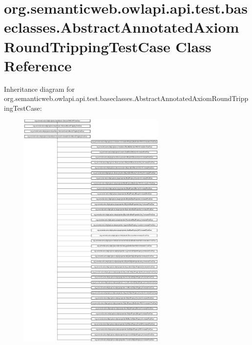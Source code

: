 \hypertarget{classorg_1_1semanticweb_1_1owlapi_1_1api_1_1test_1_1baseclasses_1_1_abstract_annotated_axiom_round_tripping_test_case}{\section{org.\-semanticweb.\-owlapi.\-api.\-test.\-baseclasses.\-Abstract\-Annotated\-Axiom\-Round\-Tripping\-Test\-Case Class Reference}
\label{classorg_1_1semanticweb_1_1owlapi_1_1api_1_1test_1_1baseclasses_1_1_abstract_annotated_axiom_round_tripping_test_case}
}
Inheritance diagram for org.\-semanticweb.\-owlapi.\-api.\-test.\-baseclasses.\-Abstract\-Annotated\-Axiom\-Round\-Tripping\-Test\-Case\-:\begin{figure}[H]
\begin{center}
\leavevmode
\includegraphics[height=12.000000cm]{classorg_1_1semanticweb_1_1owlapi_1_1api_1_1test_1_1baseclasses_1_1_abstract_annotated_axiom_round_tripping_test_case}
\end{center}
\end{figure}

